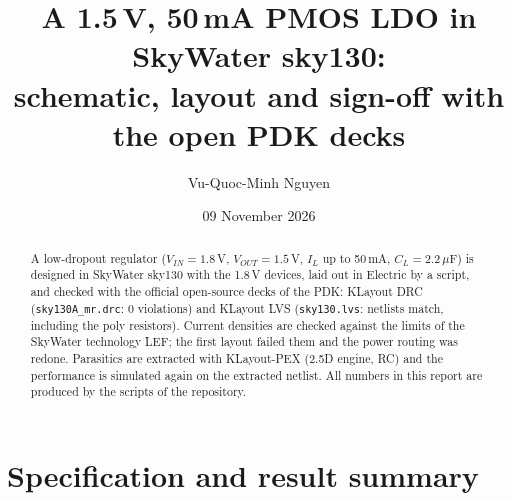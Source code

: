 \documentclass[10pt,a4paper]{article}
\title{A 1.5\,V, 50\,mA PMOS LDO in SkyWater sky130:\\ schematic, layout and sign-off with the open PDK decks}
\author{Vu-Quoc-Minh Nguyen}
\date{09 November 2026}
\newcommand{\VOUT}{V_{OUT}}
\newcommand{\VIN}{V_{IN}}
\newcommand{\IL}{I_{L}}
\begin{document}
\maketitle

\begin{abstract}
\noindent A low-dropout regulator ($\VIN = 1.8$\,V, $\VOUT = 1.5$\,V, $\IL$ up to 50\,mA, $C_L = 2.2\,\mu$F) is designed in SkyWater sky130 with the 1.8\,V devices, laid out in Electric by a script, and checked with the official open-source decks of the PDK: KLayout DRC (\texttt{sky130A\_mr.drc}: 0 violations) and KLayout LVS (\texttt{sky130.lvs}: netlists match, including the poly resistors). Current densities are checked against the limits of the SkyWater technology LEF; the first layout failed them and the power routing was redone. Parasitics are extracted with KLayout-PEX (2.5D engine, RC) and the performance is simulated again on the extracted netlist. All numbers in this report are produced by the scripts of the repository.
\end{abstract}

\section{Specification and result summary}
\end{document}
